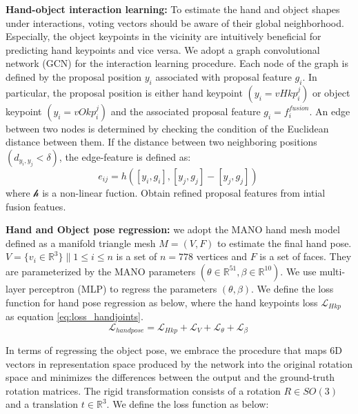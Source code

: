 \textbf{Hand-object interaction learning:} To estimate the hand and object shapes under interactions, voting vectors should be aware of their global neighborhood. Especially, the object keypoints in the vicinity are intuitively beneficial for predicting hand keypoints and vice versa. We adopt a graph convolutional network (GCN) for the interaction learning procedure. Each node of the graph is defined by the proposal position $y_i$ associated with proposal feature $g_i$. In particular, the proposal position is either hand keypoint $(y_i = vHkp^j_i)$ or object keypoint $(y_i = vOkp^j_i)$ and the associated proposal feature $g_i=f^{fusion}_i$. An edge between two nodes is determined by checking the condition of the Euclidean distance between them. If the distance between two neighboring positions $(d_{y_i, y_j} < \delta)$, the edge-feature is defined as:
\begin{equation}
	e_{ij} = \mathit{h}([y_i,g_i],[y_j, g_j]-[y_j,g_j]) \
	\label{eq:edge_feature}
\end{equation}
where $\mathcal{h}$ is a non-linear fuction. Obtain refined proposal features from intial fusion featues. 

\textbf{Hand and Object pose regression:} we adopt the MANO hand mesh model defined as a manifold triangle mesh $M = (V, F)$ to estimate the final hand pose. $V = \{ v_i \in \mathbb{R}^3 \} \| 1 \leq i \leq n$ is a set of $n=778$ vertices and $F$ is a set of faces. They are parameterized by the MANO parameters $(\theta \in \mathbb{R}^{51}, \beta \in \mathbb{R}^{10})$. We use multi-layer perceptron (MLP) to regress the parameters $(\theta, \beta)$. We define the loss function for hand pose regression as below, where the hand keypoints loss $\mathcal{L}_{Hkp}$ as equation
\ref{eq:loss_handjoints}.
\begin{equation}
	\mathcal{L}_{handpose} = \mathcal{L}_{Hkp} + \mathcal{L}_V + \mathcal{L}_{\theta} + \mathcal{L}_{\beta} \
	\label{eq:loss_handpose}
\end{equation}

In terms of regressing the object pose, we embrace the procedure that maps 6D vectors in representation space produced by the network into the original rotation space and minimizes the differences between the output and the ground-truth rotation matrices. The rigid transformation consists of a rotation $R \in SO(3)$ and a translation $t \in \mathbb{R}^3$. We define the loss function as below:

